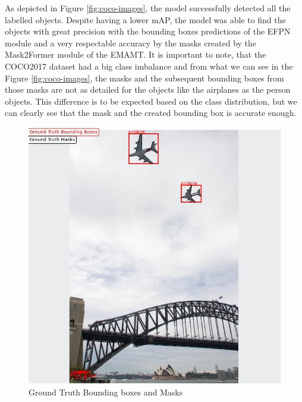 As depicted in Figure \ref{fig:coco-images}, the model successfully detected all the labelled objects. Despite having a lower mAP, the model was able to find the objects with
great precision with the bounding boxes predictions of the EFPN module and a very respectable accuracy by the masks created by the Mask2Former module of the 
EMAMT. It is important to note, that the COCO2017 dataset had a big class imbalance and from what we can see in the Figure \ref{fig:coco-images}, the masks and the subsequent 
bounding boxes from those masks are not as detailed for the objects like the airplanes as the person objects. This difference is to be expected based on the 
class distribution, but we can clearly see that the mask and the created bounding box is accurate enough. 

\begin{figure}[!h]
    \captionsetup{justification=centering}
    \centering
    \begin{minipage}{0.4\textwidth}
      \includegraphics[scale=0.35]{Figures/coco_ground_truth.jpg}
      \caption{Ground Truth Bounding boxes and Masks}
    \end{minipage}
    \hfill
    \begin{minipage}{0.4\textwidth}

\end{minipage}
\end{figure}
